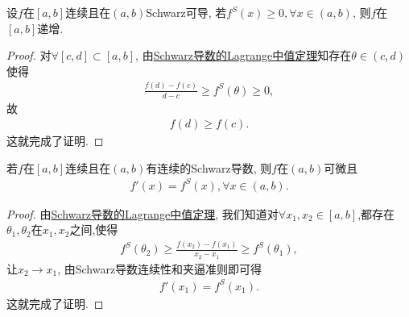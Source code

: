 \documentclass[../../main.tex]{subfiles}
\begin{document}
\begin{proposition}
设$f$在$[a,b]$连续且在$(a,b)$Schwarz可导, 若$f^S(x) \geqslant  0, \forall x \in (a,b)$, 则$f$在$[a,b]$递增.
\end{proposition}
\begin{proof}
对$\forall [c,d] \subset [a,b]$, 由\hyperref[theorem:Schwarz导数的Lagrange中值定理]{Schwarz导数的Lagrange中值定理}知存在$\theta \in (c,d)$使得
\begin{align*}
\frac{f(d) - f(c)}{d - c} \geqslant f^S(\theta) \geqslant 0,
\end{align*}
故
\begin{align*}
f(d) \geqslant f(c).
\end{align*}
这就完成了证明.
\end{proof}

\begin{proposition}
若$f$在$[a,b]$连续且在$(a,b)$有连续的Schwarz导数, 则$f$在$(a,b)$可微且
\begin{align*}
f'(x) = f^S(x), \forall x \in (a,b).
\end{align*}
\end{proposition}
\begin{proof}
由\hyperref[theorem:Schwarz导数的Lagrange中值定理]{Schwarz导数的Lagrange中值定理}, 我们知道对$\forall x_1,x_2\in [a,b]$,都存在$\theta_1,\theta_2$在$x_1,x_2$之间,使得
\begin{align*}
f^S(\theta_2) \geqslant \frac{f(x_2) - f(x_1)}{x_2 - x_1} \geqslant f^S(\theta_1),
\end{align*}
让$x_2 \to x_1$, 由Schwarz导数连续性和夹逼准则即可得
\begin{align*}
f'(x_1) = f^S(x_1).
\end{align*}
这就完成了证明.

\end{proof}
\end{document}
